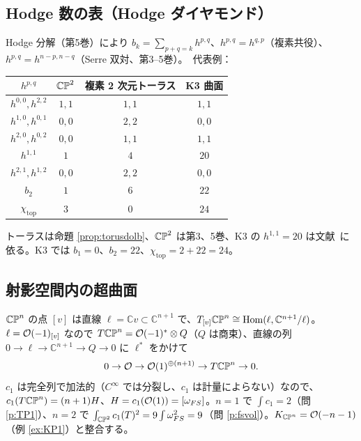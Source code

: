 \subsection{Hodge 数の表（Hodge ダイヤモンド）}
Hodge 分解（第5巻）により $b_k=\sum_{p+q=k}h^{p,q}$、$h^{p,q}=h^{q,p}$（複素共役）、$h^{p,q}=h^{n-p,n-q}$（Serre 双対、第3--5巻）。\tC\ 代表例：
\begin{center}
\begin{tabular}{c|ccc}
$h^{p,q}$ & $\mathbb{CP}^2$ & 複素 2 次元トーラス & K3 曲面\\
\midrule
$h^{0,0},h^{2,2}$ & $1,1$ & $1,1$ & $1,1$\\
$h^{1,0},h^{0,1}$ & $0,0$ & $2,2$ & $0,0$\\
$h^{2,0},h^{0,2}$ & $0,0$ & $1,1$ & $1,1$\\
$h^{1,1}$ & $1$ & $4$ & $20$\\
$h^{2,1},h^{1,2}$ & $0,0$ & $2,2$ & $0,0$\\
$b_2$ & $1$ & $6$ & $22$\\
$\chi_{\mathrm{top}}$ & $3$ & $0$ & $24$\\
\bottomrule
\end{tabular}
\end{center}
トーラスは命題 \ref{prop:torusdolb}、$\mathbb{CP}^2$ は第3、5巻、K3 の $h^{1,1}=20$ は文献\tC\ に依る。K3 では $b_1=0$、$b_2=22$、$\chi_{\mathrm{top}}=2+22=24$。

\subsection{射影空間内の超曲面}

\begin{ex}\label{ex:euler}\tC
$\mathbb{CP}^n$ の点 $[v]$ は直線 $\ell=\mathbb Cv\subset\mathbb C^{n+1}$ で、$T_{[v]}\mathbb{CP}^n\cong\mathrm{Hom}(\ell,\mathbb C^{n+1}/\ell)$。$\ell=\mathcal O(-1)_{[v]}$ なので $T\mathbb{CP}^n=\mathcal O(-1)^*\otimes Q$（$Q$ は商束）、直線の列 $0\to\ell\to\mathbb C^{n+1}\to Q\to0$ に $\ell^*$ をかけて
\[
0\to\mathcal O\to\mathcal O(1)^{\oplus(n+1)}\to T\mathbb{CP}^n\to0 .
\]
$c_1$ は完全列で加法的（$C^\infty$ では分裂し、$c_1$ は計量によらない）なので、$c_1(T\mathbb{CP}^n)=(n+1)H$、$H=c_1(\mathcal O(1))=[\omega_{FS}]$。$n=1$ で $\int c_1=2$（問 \ref{p:TP1}）、$n=2$ で $\int_{\mathbb{CP}^2}c_1(T)^2=9\int\omega_{FS}^2=9$（問 \ref{p:fsvol}）。$K_{\mathbb{CP}^n}=\mathcal O(-n-1)$（例 \ref{ex:KP1}）と整合する。
\end{ex}


